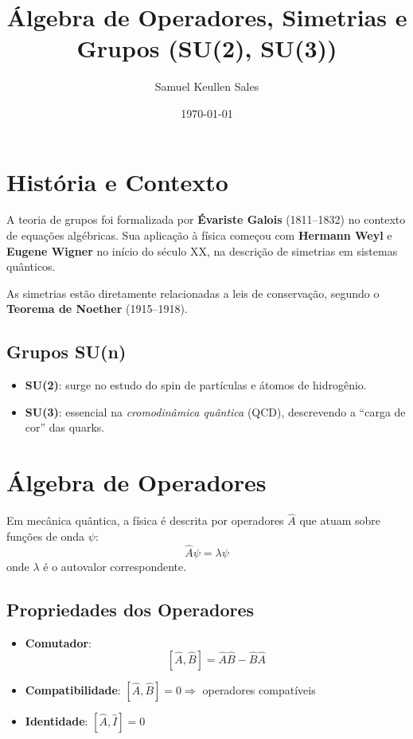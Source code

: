 \documentclass[12pt,a4paper]{article}
\title{Álgebra de Operadores, Simetrias e Grupos (SU(2), SU(3))}
\author{Samuel Keullen Sales}
\date{\today}
\begin{document}
\maketitle
\tableofcontents
\newpage

\section{História e Contexto}
A teoria de grupos foi formalizada por \textbf{Évariste Galois} (1811–1832) no contexto de equações algébricas. Sua aplicação à física começou com \textbf{Hermann Weyl} e \textbf{Eugene Wigner} no início do século XX, na descrição de simetrias em sistemas quânticos.

As simetrias estão diretamente relacionadas a leis de conservação, segundo o \textbf{Teorema de Noether} (1915–1918).

\subsection{Grupos SU(n)}
\begin{itemize}
    \item \textbf{SU(2)}: surge no estudo do spin de partículas e átomos de hidrogênio.
    \item \textbf{SU(3)}: essencial na \textit{cromodinâmica quântica} (QCD), descrevendo a “carga de cor” das quarks.
\end{itemize}

\section{Álgebra de Operadores}
Em mecânica quântica, a física é descrita por operadores $\hat{A}$ que atuam sobre funções de onda $\psi$:
\[
\hat{A} \psi = \lambda \psi
\]
onde $\lambda$ é o autovalor correspondente.

\subsection{Propriedades dos Operadores}
\begin{itemize}
    \item \textbf{Comutador}:
    \[
    [\hat{A}, \hat{B}] = \hat{A}\hat{B} - \hat{B}\hat{A}
    \]
    \item \textbf{Compatibilidade}: $[\hat{A},\hat{B}] = 0 \Rightarrow$ operadores compatíveis
    \item \textbf{Identidade}: $[\hat{A}, \hat{I}] = 0$
\end{itemize}
\end{document}
